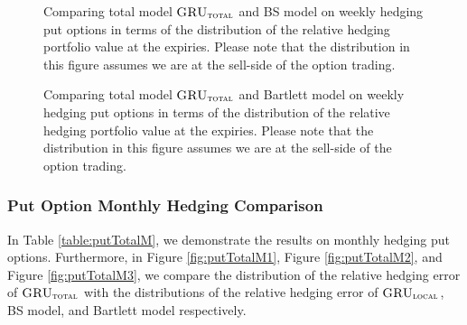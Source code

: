 \documentclass[letterpaper,12pt,titlepage,oneside,final]{book}
\numberwithin{equation}{section}
\theoremstyle{definition}
\newcommand{\modelT}{\textsc{GRU}_{\textsc{total}}}
\newcommand{\modelL}{\textsc{GRU}_{\textsc{local}}}
\begin{document}
\begin{figure}[htp!]
	\caption{Comparing total model $\modelT$ and BS model on weekly hedging put options in terms of the distribution of the  relative hedging portfolio value at the expiries. Please note that the distribution in this figure assumes we are at the sell-side of the option trading.} \label{fig:putTotalW3}
		\centering
	\caption{Comparing total model $\modelT$ and Bartlett model on weekly hedging put options in terms of the distribution of the  relative hedging portfolio value at the expiries. Please note that the distribution in this figure assumes we are at the sell-side of the option trading.} \label{fig:putTotalW2}
\end{figure}

\newpage
\subsubsection{Put Option Monthly Hedging Comparison}
In Table \ref{table:putTotalM}, we demonstrate the results on monthly hedging put options. Furthermore, in Figure \ref{fig:putTotalM1}, Figure \ref{fig:putTotalM2}, and  Figure \ref{fig:putTotalM3}, we compare the distribution of the relative hedging error of $\modelT$ with the distributions of the relative hedging error of $\modelL$, BS model, and Bartlett model respectively.
\end{document}
